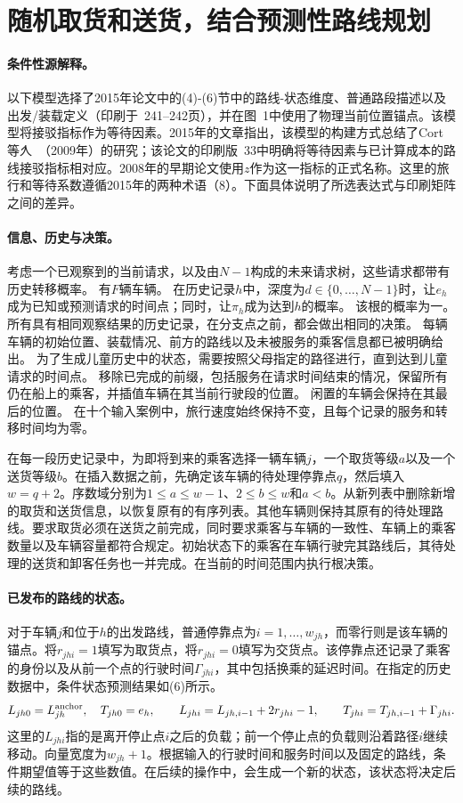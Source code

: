 \documentclass{article}
\begin{document}
\section*{随机取货和送货，结合预测性路线规划}
\paragraph{条件性源解释。}
以下模型选择了2015年论文中的(4)-(6)节中的路线-状态维度、普通路段描述以及出发/装载定义（印刷于\ 241--242页），并在图\ 1中使用了物理当前位置锚点。该模型将接驳指标作为等待因素。2015年的文章指出，该模型的构建方式总结了Cort\'等人\ （2009年）的研究；该论文的印刷版\ 33中明确将等待因素与已计算成本的路线接驳指标相对应。2008年的早期论文使用$z$作为这一指标的正式名称。这里的旅行和等待系数遵循2015年的两种术语（8）。下面具体说明了所选表达式与印刷矩阵之间的差异。

\paragraph{信息、历史与决策。}
考虑一个已观察到的当前请求，以及由$N-1$构成的未来请求树，这些请求都带有历史转移概率。 有$F$辆车辆。
在历史记录$h$中，深度为$d\in\{0,\ldots,N-1\}$时，让$e_h$成为已知或预测请求的时间点；同时，让$\pi_h$成为达到$h$的概率。 该根的概率为一。 所有具有相同观察结果的历史记录，在分支点之前，都会做出相同的决策。
每辆车辆的初始位置、装载情况、前方的路线以及未被服务的乘客信息都已被明确给出。 为了生成儿童历史中的状态，需要按照父母指定的路径进行，直到达到儿童请求的时间点。 移除已完成的前缀，包括服务在请求时间结束的情况，保留所有仍在船上的乘客，并插值车辆在其当前行驶段的位置。 闲置的车辆会保持在其最后的位置。
在十个输入案例中，旅行速度始终保持不变，且每个记录的服务和转移时间均为零。

在每一段历史记录中，为即将到来的乘客选择一辆车辆$j$，一个取货等级$a$以及一个送货等级$b$。在插入数据之前，先确定该车辆的待处理停靠点$q$，然后填入$w=q+2$。序数域分别为$1\leq a\leq w-1$、$2\leq b\leq w$和$a<b$。从新列表中删除新增的取货和送货信息，以恢复原有的有序列表。其他车辆则保持其原有的待处理路线。要求取货必须在送货之前完成，同时要求乘客与车辆的一致性、车辆上的乘客数量以及车辆容量都符合规定。初始状态下的乘客在车辆行驶完其路线后，其待处理的送货和卸客任务也一并完成。在当前的时间范围内执行根决策。

\paragraph{已发布的路线的状态。}
对于车辆$j$和位于$h$的出发路线，普通停靠点为$i=1,\ldots,w_{jh}$，而零行则是该车辆的锚点。将$r_{jhi}=1$填写为取货点，将$r_{jhi}=0$填写为交货点。该停靠点还记录了乘客的身份以及从前一个点的行驶时间$\Gamma_{jhi}$，其中包括换乘的延迟时间。在指定的历史数据中，条件状态预测结果如(6)所示。
\[
 L_{jh0}=L^{\rm anchor}_{jh},\quad T_{jh0}=e_h,\qquad
 L_{jhi}=L_{jh,i-1}+2r_{jhi}-1,\qquad
 T_{jhi}=T_{jh,i-1}+\Gamma_{jhi}.
\]
这里的$L_{jhi}$指的是离开停止点$i$之后的负载；前一个停止点的负载则沿着路径$i$继续移动。向量宽度为$w_{jh}+1$。根据输入的行驶时间和服务时间以及固定的路线，条件期望值等于这些数值。在后续的操作中，会生成一个新的状态，该状态将决定后续的路线。
\end{document}
